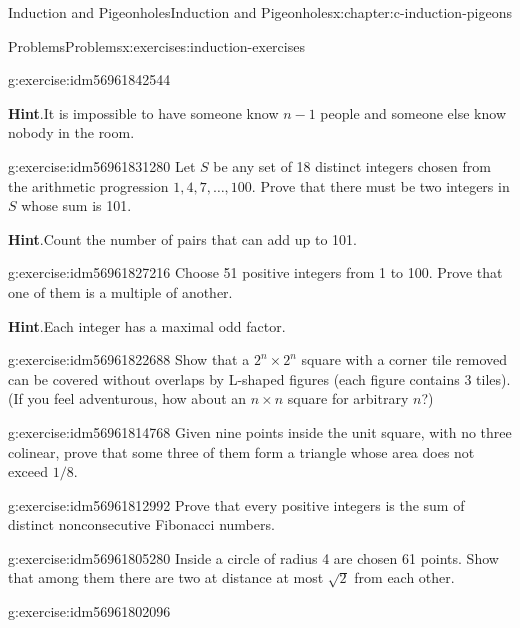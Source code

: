 \documentclass[twoside,10pt,]{book}
\newcommand{\blocktitlefont}{\relax}
\numberwithin{equation}{section}
\begin{document}
\begin{chapterptx}{Induction and Pigeonholes}{}{Induction and Pigeonholes}{}{}{x:chapter:c-induction-pigeons}
\begin{exercises-section}{Problems}{}{Problems}{}{}{x:exercises:induction-exercises}
\begin{divisionexercise}{2}{}{}{g:exercise:idm56961842544}
\par\smallskip%
\noindent\textbf{\blocktitlefont Hint}.\hypertarget{g:hint:idm56961832304}{}\quad{}It is impossible to have someone know \(n-1\) people and someone else know nobody in the room.%
\end{divisionexercise}%
\begin{divisionexercise}{3}{}{}{g:exercise:idm56961831280}%
Let \(S\) be any set of 18 distinct integers chosen from the arithmetic progression \(1, 4, 7, \dots , 100\). Prove that there must be two integers in \(S\) whose sum is 101.%
\par\smallskip%
\noindent\textbf{\blocktitlefont Hint}.\hypertarget{g:hint:idm56961829584}{}\quad{}Count the number of pairs that can add up to 101.%
\end{divisionexercise}%
\begin{divisionexercise}{4}{}{}{g:exercise:idm56961827216}%
Choose 51 positive integers from 1 to 100. Prove that one of them is a multiple of another.%
\par\smallskip%
\noindent\textbf{\blocktitlefont Hint}.\hypertarget{g:hint:idm56961823632}{}\quad{}Each integer has a maximal odd factor.%
\end{divisionexercise}%
\begin{divisionexercise}{5}{}{}{g:exercise:idm56961822688}%
Show that a \(2^n \times  2^n\) square with a corner tile removed can be covered without overlaps by L-shaped figures (each figure contains 3 tiles). (If you feel adventurous, how about an \(n \times  n\) square for arbitrary \(n\)?)%
\end{divisionexercise}%
\begin{divisionexercise}{6}{}{}{g:exercise:idm56961814768}%
Given nine points inside the unit square, with no three colinear, prove that some three of them form a triangle whose area does not exceed \(1/8\).%
\end{divisionexercise}%
\begin{divisionexercise}{7}{}{}{g:exercise:idm56961812992}%
Prove that every positive integers is the sum of distinct nonconsecutive Fibonacci numbers.%
\end{divisionexercise}%
\begin{divisionexercise}{8}{}{}{g:exercise:idm56961805280}%
Inside a circle of radius 4 are chosen 61 points. Show that among them there are two at distance at most \(\sqrt{2}\) from each other.%
\end{divisionexercise}%
\begin{divisionexercise}{9}{}{}{g:exercise:idm56961802096}%

\end{divisionexercise}
\end{exercises-section}
\end{chapterptx}
\end{document}
